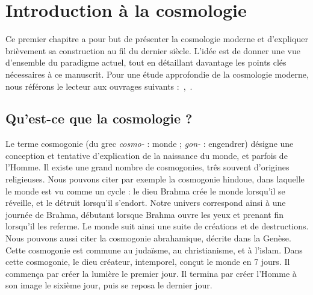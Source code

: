 \documentclass[11pt, twoside, a4paper, openright]{report}
\begin{document}

\graphicspath{ {../figures/intro/} }

\chapter{Introduction à la cosmologie}
\minitoc
\newpage
\thispagestyle{fancy}

Ce premier chapitre a pour but de présenter la cosmologie moderne et d'expliquer brièvement sa construction au fil du dernier siècle. L'idée est de donner une vue d'ensemble du paradigme actuel, tout en détaillant davantage les points clés nécessaires à ce manuscrit. Pour une étude approfondie de la cosmologie moderne, nous référons le lecteur aux ouvrages suivants :~\cite{Rich2010},~\cite{Dodelson2003}. 

\section{Qu'est-ce que la cosmologie ?}
Le terme cosmogonie (du grec \emph{cosmo-} : monde ; \emph{gon-} : engendrer) désigne une conception et tentative d'explication de la naissance du monde, et parfois de l'Homme. Il existe une grand nombre de cosmogonies, três souvent d'origines religieuses. Nous pouvons citer par exemple la cosmogonie hindoue, dans laquelle le monde est vu comme un cycle : le dieu Brahma crée le monde lorsqu'il se réveille, et le détruit lorsqu'il s'endort. Notre univers correspond ainsi à une journée de Brahma, débutant lorsque Brahma ouvre les yeux et prenant fin lorsqu'il les referme. Le monde suit ainsi une suite de créations et de destructions.
Nous pouvons aussi citer la cosmogonie abrahamique, décrite dans la Genèse. Cette cosmogonie est commune au judaïsme, au christianisme, et à l'islam. Dans cette cosmogonie, le dieu créateur, intemporel, conçut le monde en 7 jours. Il commença par créer la lumière le premier jour. Il termina par créer l'Homme à son image le sixième jour, puis se reposa le dernier jour.
\end{document}
